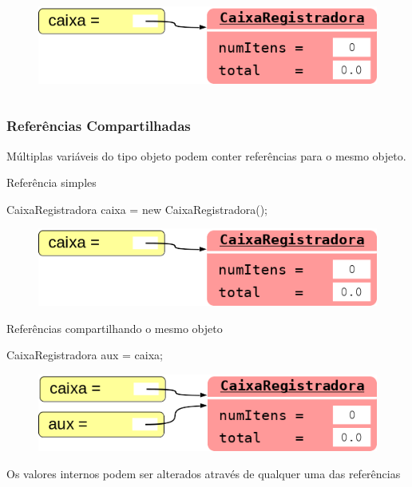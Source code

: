 \documentclass[xcolor={dvipsnames,table},aspectratio=169]{beamer}
\begin{document}
\begin{frame}[fragile]
\begin{itemize}
{\begin{columns}[T]
\begin{column}{0.4\linewidth}
\begin{figure}[h]
	\includegraphics[height=0.15\paperheight,center]{pucrs-ep-fprog-unidade_07-objetos_e_classes-laminas-referencia_a_objeto.png}
\end{figure}
	\end{column}
\end{columns}
	}
\end{itemize}
\end{frame}

\begin{frame}[fragile]\frametitle{Referências Compartilhadas}
\begin{itemize}
{\small
	\item Múltiplas variáveis do tipo objeto podem conter referências para o mesmo objeto.
	\begin{itemize}
{\small
		\item Referência simples
\begin{javacode}
CaixaRegistradora caixa = new CaixaRegistradora();
\end{javacode}
\begin{figure}[h]
	\includegraphics[height=0.10\paperheight,center]{pucrs-ep-fprog-unidade_07-objetos_e_classes-laminas-referencia_a_objeto.png}
\end{figure}
		\item Referências compartilhando o mesmo objeto
\begin{javacode}
CaixaRegistradora aux = caixa;
\end{javacode}
\begin{figure}[h]
	\includegraphics[height=0.10\paperheight,center]{pucrs-ep-fprog-unidade_07-objetos_e_classes-laminas-referencia_a_objeto_2.png}
\end{figure}
}
	\end{itemize}
	\item Os valores internos podem ser alterados através de qualquer uma das referências
}
\end{itemize}
\end{frame}
\end{document}

